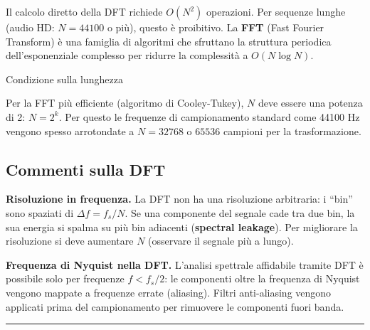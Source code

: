 \documentclass[
  italian,
  openany]{book}
\begin{document}
Il calcolo diretto della DFT richiede \(O(N^2)\) operazioni. Per
sequenze lunghe (audio HD: \(N = 44100\) o più), questo è proibitivo. La
\textbf{FFT} (Fast Fourier Transform) è una famiglia di algoritmi che
sfruttano la struttura periodica dell'esponenziale complesso per ridurre
la complessità a \(O(N \log N)\).

\begin{calloutnote}{Condizione sulla lunghezza}

Per la FFT più efficiente (algoritmo di Cooley-Tukey), \(N\) deve essere
una potenza di 2: \(N = 2^k\). Per questo le frequenze di campionamento
standard come 44100 Hz vengono spesso arrotondate a \(N = 32768\) o
\(65536\) campioni per la trasformazione.

\end{calloutnote}

\subsection{Commenti sulla DFT}\label{commenti-sulla-dft}

\textbf{Risoluzione in frequenza.} La DFT non ha una risoluzione
arbitraria: i ``bin'' sono spaziati di \(\Delta f = f_s / N\). Se una
componente del segnale cade tra due bin, la sua energia si spalma su più
bin adiacenti (\textbf{spectral leakage}). Per migliorare la risoluzione
si deve aumentare \(N\) (osservare il segnale più a lungo).

\textbf{Frequenza di Nyquist nella DFT.} L'analisi spettrale affidabile
tramite DFT è possibile solo per frequenze \(f < f_s/2\): le componenti
oltre la frequenza di Nyquist vengono mappate a frequenze errate
(aliasing). Filtri anti-aliasing vengono applicati prima del
campionamento per rimuovere le componenti fuori banda.

\begin{center}\rule{0.5\linewidth}{0.5pt}\end{center}
\end{document}
